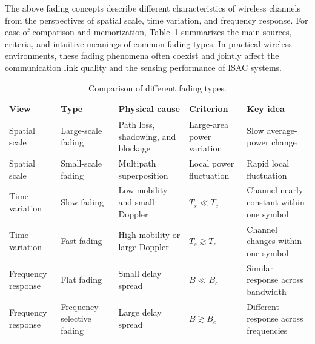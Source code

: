 The above fading concepts describe different characteristics of wireless channels
from the perspectives of spatial scale,
time variation,
and frequency response.
For ease of comparison and memorization,
Table~\ref{tab:fading-types-comparison} summarizes the main sources,
criteria,
and intuitive meanings of common fading types.
In practical wireless environments,
these fading phenomena often coexist
and jointly affect the communication link quality and the sensing performance of ISAC systems.
\begin{table}[htbp]
    \centering
    \caption{Comparison of different fading types.}
    \label{tab:fading-types-comparison}
    \small
    \renewcommand{\arraystretch}{1.25}
    \begin{tabularx}{\textwidth}{
        >{\raggedright\arraybackslash}p{}
        >{\raggedright\arraybackslash}p{}
        >{\raggedright\arraybackslash}p{}
        >{\centering\arraybackslash}p{}
        >{\raggedright\arraybackslash}X
    }
        \toprule
        \textbf{View}
        &
        \textbf{Type}
        &
        \textbf{Physical cause}
        &
        \textbf{Criterion}
        &
        \textbf{Key idea}
        \\
        \midrule

        Spatial scale
        &
        Large-scale fading
        &
        Path loss, shadowing, and blockage
        &
        Large-area power variation
        &
        Slow average-power change
        \\

        Spatial scale
        &
        Small-scale fading
        &
        Multipath superposition
        &
        Local power fluctuation
        &
        Rapid local fluctuation
        \\

        Time variation
        &
        Slow fading
        &
        Low mobility and small Doppler
        &
        \(T_s \ll T_c\)
        &
        Channel nearly constant within one symbol
        \\

        Time variation
        &
        Fast fading
        &
        High mobility or large Doppler
        &
        \(T_s \gtrsim T_c\)
        &
        Channel changes within one symbol
        \\

        Frequency response
        &
        Flat fading
        &
        Small delay spread
        &
        \(B \ll B_c\)
        &
        Similar response across bandwidth
        \\

        Frequency response
        &
        Frequency-selective fading
        &
        Large delay spread
        &
        \(B \gtrsim B_c\)
        &
        Different response across frequencies
        \\
        \bottomrule
    \end{tabularx}
\end{table}


